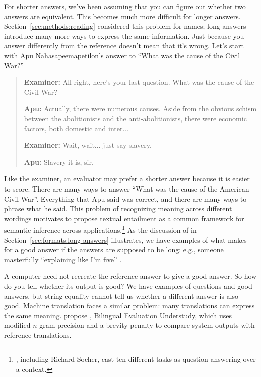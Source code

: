 For shorter answers, we've been assuming that you can figure out whether two answers are equivalent.  This becomes much more difficult for longer answers.
Section~\ref{sec:methods:reading} considered this problem for names; long answers introduce many more ways to express the same information.
Just because you answer differently from the reference doesn't mean that it's wrong.  Let's start with Apu Nahasapeemapetilon's answer to ``What was the cause of the  Civil War?''

\begin{quote}
	\textbf{Examiner:} All right, here's your last question. What was the cause of the Civil War?
	
	\textbf{Apu:} Actually, there were numerous causes. Aside from the obvious schism between the abolitionists and the anti-abolitionists, there were economic factors, both domestic and inter...
	
	\textbf{Examiner:} Wait, wait... just say slavery.
	
	\textbf{Apu:} Slavery it is, sir.
\end{quote}

Like the examiner, an evaluator may prefer a shorter answer because it is easier to score.   There are many ways to answer ``What was the cause of the American Civil War''.  Everything that Apu said was correct, and there are many ways to phrase what he said.  This problem of recognizing meaning across different wordings motivates \citet{dagan-glickman-04} to propose textual entailment as a common framework for semantic inference across  applications.\footnote{\citet{mccann-18-decathlon}, including Richard Socher, cast ten different  tasks as question answering over a context.}  As the discussion of  in Section~\ref{sec:formats:long-answers} illustrates, we have examples of what makes for a good answer if the answers are supposed to be long: e.g., someone masterfully ``explaining like I'm five'' .


A computer need not recreate the reference answer to give a good answer.  So how do you tell whether its output is good?
We have examples of questions and good answers, but string equality cannot tell us whether a different answer is also good.
Machine translation faces a similar problem: many translations can express the same meaning.  \citet{papineni-02} propose , Bilingual Evaluation Understudy, which uses modified $n$-gram precision and a brevity penalty to compare system outputs with reference translations.

